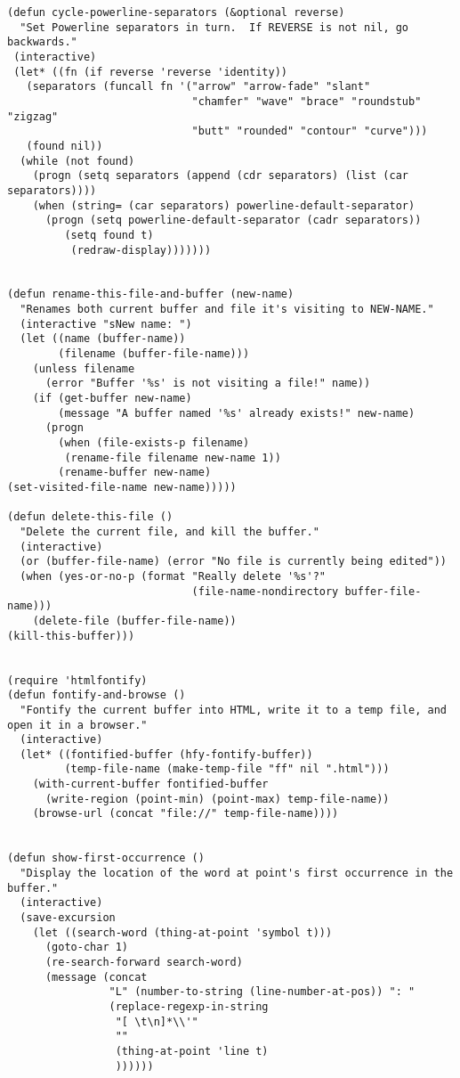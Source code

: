\documentclass{article}
\begin{document}
\begin{verbatim}
(defun cycle-powerline-separators (&optional reverse)
  "Set Powerline separators in turn.  If REVERSE is not nil, go backwards."
 (interactive)
 (let* ((fn (if reverse 'reverse 'identity))
   (separators (funcall fn '("arrow" "arrow-fade" "slant"
                             "chamfer" "wave" "brace" "roundstub" "zigzag"
                             "butt" "rounded" "contour" "curve")))
   (found nil))
  (while (not found)
    (progn (setq separators (append (cdr separators) (list (car separators))))
    (when (string= (car separators) powerline-default-separator)
      (progn (setq powerline-default-separator (cadr separators))
         (setq found t)
          (redraw-display)))))))


(defun rename-this-file-and-buffer (new-name)
  "Renames both current buffer and file it's visiting to NEW-NAME."
  (interactive "sNew name: ")
  (let ((name (buffer-name))
        (filename (buffer-file-name)))
    (unless filename
      (error "Buffer '%s' is not visiting a file!" name))
    (if (get-buffer new-name)
        (message "A buffer named '%s' already exists!" new-name)
      (progn
        (when (file-exists-p filename)
         (rename-file filename new-name 1))
        (rename-buffer new-name)
(set-visited-file-name new-name)))))

(defun delete-this-file ()
  "Delete the current file, and kill the buffer."
  (interactive)
  (or (buffer-file-name) (error "No file is currently being edited"))
  (when (yes-or-no-p (format "Really delete '%s'?"
                             (file-name-nondirectory buffer-file-name)))
    (delete-file (buffer-file-name))
(kill-this-buffer)))


(require 'htmlfontify)
(defun fontify-and-browse ()
  "Fontify the current buffer into HTML, write it to a temp file, and open it in a browser."
  (interactive)
  (let* ((fontified-buffer (hfy-fontify-buffer))
         (temp-file-name (make-temp-file "ff" nil ".html")))
    (with-current-buffer fontified-buffer
      (write-region (point-min) (point-max) temp-file-name))
    (browse-url (concat "file://" temp-file-name))))


(defun show-first-occurrence ()
  "Display the location of the word at point's first occurrence in the buffer."
  (interactive)
  (save-excursion
    (let ((search-word (thing-at-point 'symbol t)))
      (goto-char 1)
      (re-search-forward search-word)
      (message (concat
                "L" (number-to-string (line-number-at-pos)) ": "
                (replace-regexp-in-string
                 "[ \t\n]*\\'"
                 ""
                 (thing-at-point 'line t)
                 ))))))


\end{verbatim}
\end{document}
